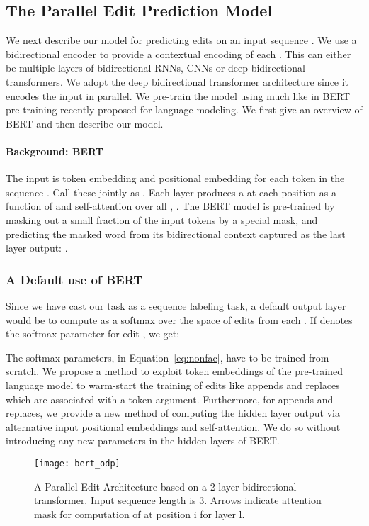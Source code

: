 \documentclass[11pt,a4paper]{article}
\newcommand{\maskT}{{\mbox{\sc mask}}}
\begin{document}
\subsection{The Parallel Edit Prediction Model}
\label{sec:arch}
We next describe our model for predicting edits  on an input sequence .  We use a bidirectional encoder to provide a contextual encoding of each . This can either be multiple layers of bidirectional RNNs, CNNs or deep bidirectional transformers.  We adopt the deep bidirectional transformer architecture since it encodes the input in parallel.   
We pre-train the model using  much like in
BERT pre-training recently proposed for language modeling\cite{devlin2018bert}. We first give an overview of BERT and then describe our model.

\paragraph{Background: BERT}
The input is token embedding  and positional embedding  for each token  in the sequence .  Call these jointly as  .  Each layer  produces a   at each position  as a function of  and self-attention over all , . The BERT model is pre-trained by masking out a small fraction of the input tokens by a special \maskT,  
and predicting the masked word from its bidirectional context captured as the last layer output: .

\subsubsection{A Default use of BERT}
\label{sec:default}
Since we have cast our task as a sequence labeling task, a default output layer would be to compute  as a softmax over the space of edits  from each . If  denotes the softmax parameter for edit , we get:   

The softmax parameters,  in Equation~\ref{eq:nonfac}, have to be trained from scratch. We propose a method to exploit token embeddings of the pre-trained language model to warm-start the training of edits like appends and replaces which are associated with a token argument.
Furthermore, for appends and replaces, we provide a new method of computing the hidden layer output 
via alternative input positional embeddings and  self-attention. We do so without  introducing any new parameters in the hidden layers of BERT.

\begin{figure}
    \centering
    \texttt{[image: bert\_odp]}
    \caption{A Parallel Edit Architecture based on a 2-layer bidirectional transformer. Input sequence length is 3. Arrows indicate attention mask for computation of  at position i for layer l.}
    \label{fig:pieArch}
\end{figure}
\end{document}
